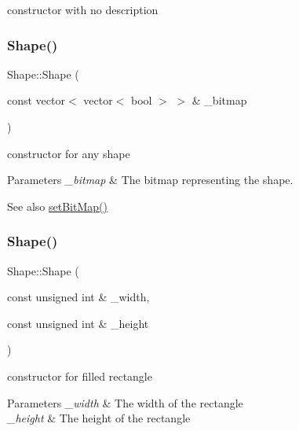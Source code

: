 constructor with no description 

\mbox{\label{class_shape_a8b614d73e9091d05a3e8b5a119bf509a}} 
\subsubsection{\texorpdfstring{Shape()}{Shape()}\hspace{0.1cm}{\footnotesize\ttfamily [2/3]}}
{\footnotesize\ttfamily Shape\+::\+Shape (\begin{DoxyParamCaption}\item[{const vector$<$ vector$<$ bool $>$ $>$ \&}]{\+\_\+bitmap }\end{DoxyParamCaption})\hspace{0.3cm}{\ttfamily [inline]}}



constructor for any shape 


\begin{DoxyParams}{Parameters}
{\em \+\_\+bitmap} & The bitmap representing the shape. \\
\hline
\end{DoxyParams}
\begin{DoxySeeAlso}{See also}
\mbox{\hyperlink{class_shape_ad539a5441a4aaa95349fd1bfc76043a1}{set\+Bit\+Map()}} 
\end{DoxySeeAlso}
\mbox{\label{class_shape_a37e0820a3b0346435b5fa57761480b32}} 
\subsubsection{\texorpdfstring{Shape()}{Shape()}\hspace{0.1cm}{\footnotesize\ttfamily [3/3]}}
{\footnotesize\ttfamily Shape\+::\+Shape (\begin{DoxyParamCaption}\item[{const unsigned int \&}]{\+\_\+width,  }\item[{const unsigned int \&}]{\+\_\+height }\end{DoxyParamCaption})\hspace{0.3cm}{\ttfamily [inline]}}



constructor for filled rectangle 


\begin{DoxyParams}{Parameters}
{\em \+\_\+width} & The width of the rectangle \\
\hline
{\em \+\_\+height} & The height of the rectangle \\
\hline
\end{DoxyParams}


